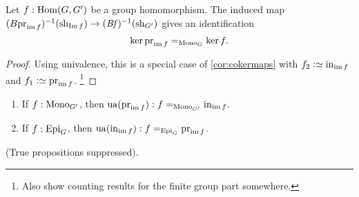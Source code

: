 \begin{lemma}
  \label{lem:kerandcoker}
  \label{lem:countinggps}
  Let $f:\Hom(G,G')$ be a group homomorphism.
  The induced map $(B\prj_{\img f})^{-1}(\shape_{\Img f})\to (\Bf)^{-1}(\shape_{G'})$ gives an identification
  $$\ker\prj_{\img f}=_{\typemono_G} \ker f.$$
\end{lemma}
\begin{proof}
  Using univalence, this is a special case of \cref{cor:cokermaps} with $f_2\defequi\incl_{\img f}$ and $f_1\defequi\prj_{\img f}$.
  \footnote{\color{blue}
 Also show counting results for the finite group part somewhere.}
\end{proof}
\begin{xca}
  \begin{enumerate}
  \item If $f:\mathrm{Mono}_{G'}$, then $\ua(\prj_{\img f}):f=_{\typemono_{G'}}\incl_{\img f}$.
  \item If $f:\mathrm{Epi}_G$, then $\ua(\incl_{\img f}):f=_{\typeepi_{G}}\prj_{\img f}$.
  \end{enumerate}
(True propositions suppressed).
\end{xca}





